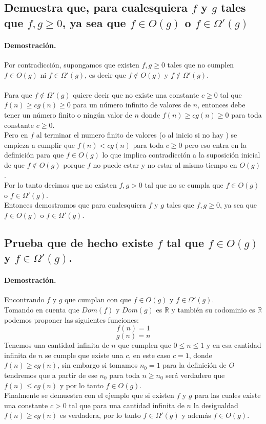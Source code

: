 \documentclass[12pt]{article}
\begin{document}
\subsection{Demuestra que, para cualesquiera $f$ y $g$ tales que $f,g\geq 0$, ya sea que $f\in O(g)$ o $f\in\Omega'(g)$}
\paragraph{Demostración.} Por contradicción, supongamos que existen $f,g\geq 0$  tales que no cumplen $f\in O(g)$ ni $f\in\Omega'(g)$, es decir que $f\notin O(g)$ y $f\notin\Omega'(g)$.\\\\
Para que $f\notin\Omega'(g)$ quiere decir que no existe una constante $c\geq0$ tal que $f(n)\geq cg(n)\geq 0$ para un número infinito de valores de $n$, entonces debe tener un número finito o ningún valor de $n$ donde $f(n)\geq cg(n)\geq 0$ para toda constante $c\geq0$.
\\
Pero en $f$ al terminar el numero finito de valores (o al inicio si no hay ) se empieza a cumplir que $f(n)<cg(n)$ para toda $c\geq0$ pero eso entra en la definición para que $f\in O(g)$ lo que implica contradicción a la suposición inicial de que $f\notin O(g)$ porque $f$ no puede estar y no estar al mismo tiempo en $O(g)$. \\
Por lo tanto decimos que no existen $f,g>0$ tal que no se cumpla que $f\in O(g)$ o $f\in\Omega'(g)$.\\
Entonces demostramos que para cualesquiera $f$ y $g$ tales que $f,g\geq 0$, ya sea que $f\in O(g)$ o $f\in\Omega'(g)$.
\pagebreak
\subsection{Prueba que de hecho existe $f$ tal que $f\in O(g)$ y $f\in\Omega'(g)$.}
\paragraph{Demostración.} Encontrando $f$ y $g$ que cumplan con que $f\in O(g)$ y $f\in\Omega'(g)$.\\
Tomando en cuenta que $Dom(f)$ y $Dom(g)$ es $\mathbb{R}$ y también su codominio es  $\mathbb{R}$  podemos proponer las siguientes funciones:
\begin{equation}\label{f_ej3}
f(n) = 1
\end{equation}
\begin{equation}\label{g_ej3}
g(n) = n
\end{equation}
Tenemos una cantidad infinita de $n$ que cumplen que $0\leq n \leq 1$ y en esa cantidad infinita de $n$ se cumple que existe una $c$, en este caso $c=1$, donde $f(n)\geq cg(n)$, sin embargo si tomamos $n_{0}=1$ para la definición de $O$ tendremos que a partir de ese $n_{0}$ para toda $n \geq n_{0}$ será verdadero que 
$f(n)\leq cg(n)$ y por lo tanto $f\in O(g)$.\\ Finalmente se demuestra con el ejemplo que si existen $f$ y $g$ para las cuales existe una constante $c>0$ tal que para una cantidad infinita de $n$ la desigualdad  $f(n) \geq cg(n)$ es verdadera, por lo tanto $f\in\Omega'(g)$ y además $f\in O(g)$.
\end{document}
